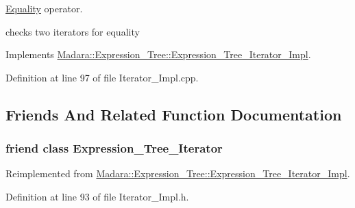 \hyperlink{classMadara_1_1Expression__Tree_1_1Equality}{Equality} operator. 

checks two iterators for equality 

Implements \hyperlink{classMadara_1_1Expression__Tree_1_1Expression__Tree__Iterator__Impl_a05aaa44a9c047b7863789792d8d7830a}{Madara::Expression\_\-Tree::Expression\_\-Tree\_\-Iterator\_\-Impl}.



Definition at line 97 of file Iterator\_\-Impl.cpp.



\subsection{Friends And Related Function Documentation}
\hypertarget{classMadara_1_1Expression__Tree_1_1In__Order__Iterator__Impl_adfe8d209b4dd64ac100d4c9c9adf08c1}{
\subsubsection[{Expression\_\-Tree\_\-Iterator}]{\setlength{\rightskip}{0pt plus 5cm}friend class {\bf Expression\_\-Tree\_\-Iterator}}}
\label{d5/d7e/classMadara_1_1Expression__Tree_1_1In__Order__Iterator__Impl_adfe8d209b4dd64ac100d4c9c9adf08c1}


Reimplemented from \hyperlink{classMadara_1_1Expression__Tree_1_1Expression__Tree__Iterator__Impl_adfe8d209b4dd64ac100d4c9c9adf08c1}{Madara::Expression\_\-Tree::Expression\_\-Tree\_\-Iterator\_\-Impl}.



Definition at line 93 of file Iterator\_\-Impl.h.

